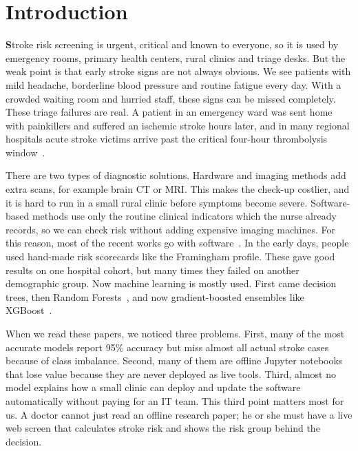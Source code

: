 \documentclass[10pt,twocolumn,a4paper]{article}
\begin{document}
\section{Introduction}
\noindent\textbf{S}troke risk screening is urgent, critical and known to everyone, so it is used by emergency rooms, primary health centers, rural clinics and triage desks. But the weak point is that early stroke signs are not always obvious. We see patients with mild headache, borderline blood pressure and routine fatigue every day. With a crowded waiting room and hurried staff, these signs can be missed completely. These triage failures are real. A patient in an emergency ward was sent home with painkillers and suffered an ischemic stroke hours later, and in many regional hospitals acute stroke victims arrive past the critical four-hour thrombolysis window~\cite{buhai2026}.

There are two types of diagnostic solutions. Hardware and imaging methods add extra scans, for example brain CT or MRI. This makes the check-up costlier, and it is hard to run in a small rural clinic before symptoms become severe. Software-based methods use only the routine clinical indicators which the nurse already records, so we can check risk without adding expensive imaging machines. For this reason, most of the recent works go with software~\cite{buhai2026, paleyes2022}. In the early days, people used hand-made risk scorecards like the Framingham profile. These gave good results on one hospital cohort, but many times they failed on another demographic group. Now machine learning is mostly used. First came decision trees, then Random Forests~\cite{chawla2002}, and now gradient-boosted ensembles like XGBoost~\cite{laurikkala2001}.

When we read these papers, we noticed three problems. First, many of the most accurate models report 95\% accuracy but miss almost all actual stroke cases because of class imbalance. Second, many of them are offline Jupyter notebooks that lose value because they are never deployed as live tools. Third, almost no model explains how a small clinic can deploy and update the software automatically without paying for an IT team. This third point matters most for us. A doctor cannot just read an offline research paper; he or she must have a live web screen that calculates stroke risk and shows the risk group behind the decision.
\end{document}
